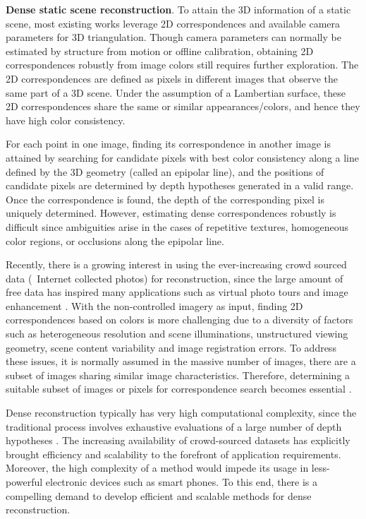 \textbf{Dense static scene reconstruction}.
To attain the 3D information of a static scene, most existing works leverage 2D correspondences and available camera parameters for 3D triangulation. Though camera parameters can normally be estimated by structure from motion or offline calibration, obtaining 2D correspondences robustly from image colors still requires further exploration. The 2D correspondences are defined as pixels in different images that observe the same part of a 3D scene. Under the assumption of a Lambertian surface, these 2D correspondences share the same or similar appearances/colors, and hence they have high color consistency.

For each point in one image, finding its correspondence in another image is attained by searching for candidate pixels with best color consistency along a line defined by the 3D geometry (called an epipolar line), and the positions of candidate pixels are determined by depth hypotheses generated in a valid range. Once the correspondence is found, the depth of the corresponding pixel is uniquely determined. However, estimating dense correspondences robustly is difficult since ambiguities arise in the cases of repetitive textures, homogeneous color regions, or occlusions along the epipolar line. 

Recently, there is a growing interest in using the ever-increasing crowd sourced data (\ie~Internet collected photos) for reconstruction, since the large amount of free data has inspired many applications such as virtual photo tours \cite{Snavely2} and image enhancement \cite{zhang2014personal}. With the non-controlled imagery as input, finding 2D correspondences based on colors is more challenging due to a diversity of factors such as heterogeneous resolution and scene illuminations, unstructured viewing geometry, scene content variability and image registration errors. To address these issues, it is normally assumed in the massive number of images, there are a subset of images sharing similar image characteristics. Therefore, determining a suitable subset of images or pixels for correspondence search becomes essential \cite{Goesele07}.

Dense reconstruction typically has very high computational complexity, since the traditional process involves exhaustive evaluations of a large number of depth hypotheses \cite{yang2003multi}. The increasing availability of crowd-sourced datasets has explicitly brought efficiency and scalability to the forefront of application requirements.  Moreover, the high complexity of a method would impede its usage in less-powerful electronic devices such as smart phones. To this end, there is a compelling demand to develop efficient and scalable methods for dense reconstruction.


